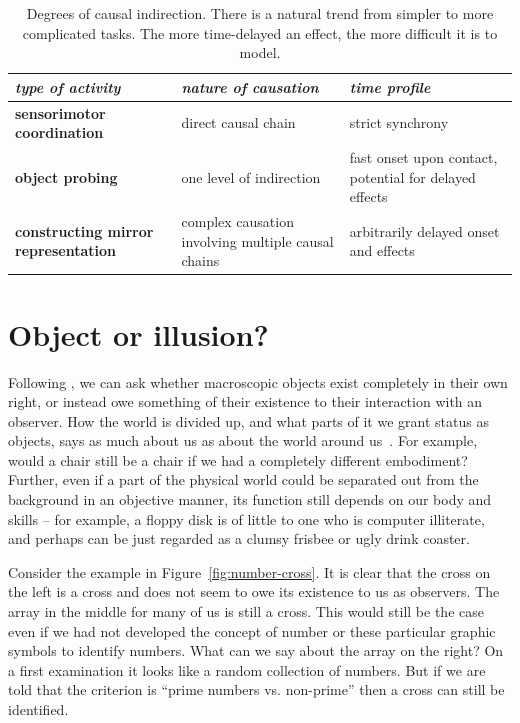 \begin{table}[htbp]
\begin{center}
\begin{tabular}{|p{5.2cm}|p{4.5cm}|p{4.5cm}|}
\hline
{\it type of activity} & {\it nature of causation} &  {\it time profile} \\ \hline\hline
{\bf sensorimotor coordination} & direct causal chain & strict synchrony \\ \hline
{\bf object probing} & one level of indirection & fast onset upon contact, potential for delayed effects\\ \hline
{\bf constructing mirror representation} &  complex causation involving multiple causal chains & arbitrarily delayed onset and effects\\ \hline
\end{tabular}
\caption{
\label{tab:causation}
%
Degrees of causal indirection. There is a natural
trend from simpler to more complicated tasks.  The more time-delayed
an effect, the more difficult it is to model.
%
}
\end{center}
\end{table}

\section{Object or illusion?}

Following \cite{manzotti01coscienza}, we can ask whether macroscopic
objects exist completely in their own right, or instead owe something
of their existence to their interaction with an observer.  
How the world is divided up, and what parts of it we grant status
as objects, says as much about us as about the world around 
us~\cite{hendriksjansen96catching}.
%
%
For example, would a chair still be a chair if we had a completely different
embodiment? Further, even if a part of the physical world could be
separated out from the background in an objective manner, its function still depends on our
body and skills -- for example, a floppy disk is of
little to one who is computer illiterate, and perhaps can be just regarded as
a clumsy frisbee or ugly drink coaster.

Consider the example in Figure~\ref{fig:number-cross}. It is
clear that the cross on the left is a cross and does not seem to owe 
its existence to us as observers. The array in the middle for
many of us is still a cross. This would still be the case 
even if we had not developed the concept of number or these particular
graphic symbols to identify numbers. What can we say about the array 
on the right? On a first examination it looks like a random collection
of numbers. But if we are told that the criterion is ``prime numbers 
vs. non-prime'' then a cross can still be identified.

